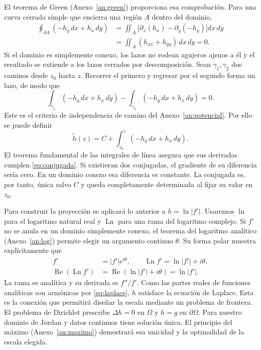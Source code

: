 El teorema de Green (Anexo~\ref{an:green}) proporciona esa comprobación. Para una curva cerrada simple que encierra una región $A$ dentro del dominio,
\begin{equation}
 \begin{aligned}
 \oint_{\partial A}(-h_y\,dx+h_x\,dy)
 &=\iint_A\bigl[\partial_x(h_x)-\partial_y(-h_y)\bigr]dx\,dy\\
 &=\iint_A(h_{xx}+h_{yy})\,dx\,dy=0.
 \end{aligned}\label{eq:green}
\end{equation}
Si el dominio es simplemente conexo, los lazos no rodean agujeros ajenos a él y el resultado se extiende a los lazos cerrados por descomposición. Sean $\gamma_1,\gamma_2$ dos caminos desde $z_0$ hasta $z$. Recorrer el primero y regresar por el segundo forma un lazo, de modo que
\begin{equation}
 \int_{\gamma_1}(-h_y\,dx+h_x\,dy)
 -\int_{\gamma_2}(-h_y\,dx+h_x\,dy)=0.
 \label{eq:caminos}
\end{equation}
Este es el criterio de independencia de camino del Anexo~\ref{an:potencial}. Por ello se puede definir
\begin{equation}
 \widetilde h(z)=C+\int_{z_0}^{z}(-h_y\,dx+h_x\,dy).
 \label{eq:potencial}
\end{equation}
El teorema fundamental de las integrales de línea asegura que sus derivadas cumplen \eqref{eq:conjugada}. Si existieran dos conjugadas, el gradiente de su diferencia sería cero. En un dominio conexo esa diferencia es constante. La conjugada es, por tanto, única salvo $C$ y queda completamente determinada al fijar su valor en $z_0$.

Para construir la proyección se aplicará lo anterior a $h=\ln|f'|$. Usaremos $\ln$ para el logaritmo natural real y $\operatorname{Ln}$ para una rama del logaritmo complejo. Si $f'$ no se anula en un dominio simplemente conexo, el teorema del logaritmo analítico (Anexo~\ref{an:log}) permite elegir un argumento continuo $\theta$. Su forma polar muestra explícitamente que
\begin{equation}
 \begin{aligned}
 f'&=|f'|e^{i\theta},\qquad
 \operatorname{Ln}f'=\ln|f'|+i\theta,\\
 \operatorname{Re}(\operatorname{Ln}f')
 &=\operatorname{Re}(\ln|f'|+i\theta)=\ln|f'|.
 \end{aligned}\label{eq:log_armonico}
\end{equation}
La rama es analítica y su derivada es $f''/f'$. Como las partes reales de funciones analíticas son armónicas por \eqref{eq:laplace}, $h$ satisface la ecuación de Laplace. Esta es la conexión que permitirá diseñar la escala mediante un problema de frontera. El problema de Dirichlet prescribe $\Delta h=0$ en $\Omega$ y $h=g$ en $\partial\Omega$. Para nuestro dominio de Jordan y datos continuos tiene solución única. El principio del máximo (Anexo~\ref{an:maximo}) demostrará esa unicidad y la optimalidad de la escala elegida.

